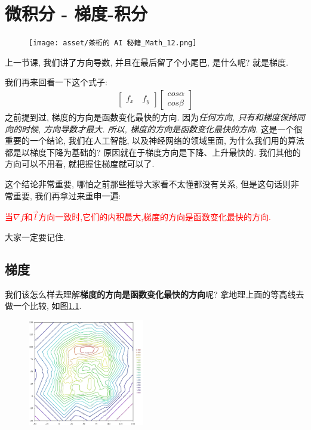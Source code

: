 \chapter{微积分 - 梯度-积分}

\begin{figure}[ht]
  \centering
  \texttt{[image: asset/茶桁的 AI 秘籍\_Math\_12.png]}
\end{figure}

\newpage

上一节课, 我们讲了方向导数, 并且在最后留了个小尾巴, 是什么呢? 就是梯度. 

我们再来回看一下这个式子:
\begin{align*}
  \begin{bmatrix} f_x \quad f_y  \end{bmatrix}
  \begin{bmatrix} cos \alpha \\ cos \beta \end{bmatrix}
\end{align*}
之前提到过, 梯度的方向是函数变化最快的方向. 因为\textit{任何方向, 只有和梯度保持同向的时候, 方向导数才最大. 所以, 梯度的方向是函数变化最快的方向}. 这是一个很重要的一个结论, 我们在人工智能, 以及神经网络的领域里面, 为什么我们用的算法都是以梯度下降为基础的? 原因就在于梯度方向是下降、上升最快的. 我们其他的方向可以不用看, 就把握住梯度就可以了. 

这个结论非常重要, 哪怕之前那些推导大家看不太懂都没有关系, 但是这句话则非常重要, 我们再拿过来重申一遍:

\textcolor{red}{当$\nabla f$和$\vec l$方向一致时,它们的内积最大,梯度的方向是函数变化最快的方向. }

大家一定要记住. 

\section{梯度}

我们该怎么样去理解\textbf{梯度的方向是函数变化最快的方向}呢? 拿地理上面的等高线去做一个比较, 如图\ref{fig:img13_1}. 

\begin{figure}[ht]
  \centering
  \includegraphics[width=0.45\textwidth]{asset/20230901221656.png}
  \caption{}
  \label{fig:img13_1}
\end{figure}

